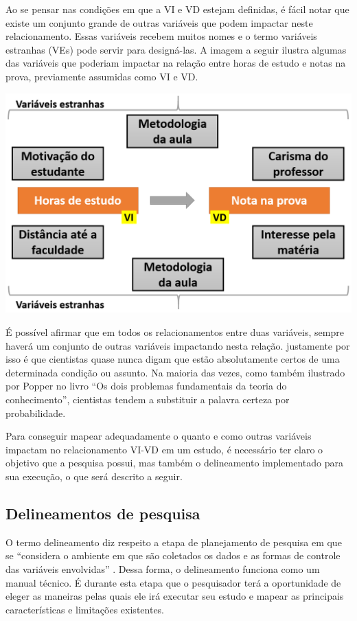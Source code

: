 \documentclass[
]{book}
\begin{document}
Ao se pensar nas condições em que a VI e VD estejam definidas, é fácil notar que existe um conjunto grande de outras variáveis que podem impactar neste relacionamento. Essas variáveis recebem muitos nomes e o termo variáveis estranhas (VEs) pode servir para designá-las. A imagem a seguir ilustra algumas das variáveis que poderiam impactar na relação entre horas de estudo e notas na prova, previamente assumidas como VI e VD.

\includegraphics{./img/cap_variavel_estranha.png}

É possível afirmar que em todos os relacionamentos entre duas variáveis, sempre haverá um conjunto de outras variáveis impactando nesta relação. justamente por isso é que cientistas quase nunca digam que estão absolutamente certos de uma determinada condição ou assunto. Na maioria das vezes, como também ilustrado por Popper no livro ``Os dois problemas fundamentais da teoria do conhecimento'', cientistas tendem a substituir a palavra certeza por probabilidade.

Para conseguir mapear adequadamente o quanto e como outras variáveis impactam no relacionamento VI-VD em um estudo, é necessário ter claro o objetivo que a pesquisa possui, mas também o delineamento implementado para sua execução, o que será descrito a seguir.

\hypertarget{delineamentos-de-pesquisa}{%
\subsection{Delineamentos de pesquisa}\label{delineamentos-de-pesquisa}}

O termo delineamento diz respeito a etapa de planejamento de pesquisa em que se ``considera o ambiente em que são coletados os dados e as formas de controle das variáveis envolvidas'' \citep{gil2002}. Dessa forma, o delineamento funciona como um manual técnico. É durante esta etapa que o pesquisador terá a oportunidade de eleger as maneiras pelas quais ele irá executar seu estudo e mapear as principais características e limitações existentes.
\end{document}
